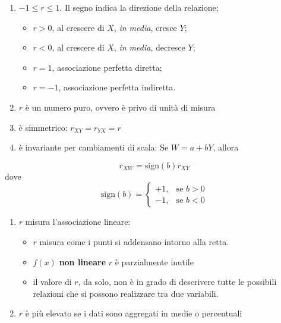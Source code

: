 \documentclass[
  11pt,
]{book}
\providecommand{\tightlist}{%
  \setlength{\itemsep}{0pt}\setlength{\parskip}{0pt}}
\theoremstyle{mytheoremstyle}
\theoremstyle{mydefstyle}
\begin{document}
\begin{info}

\begin{enumerate}
\def\labelenumi{\arabic{enumi}.}
\tightlist
\item
  \(-1 \le r \le 1\). Il segno indica la direzione della relazione;

  \begin{itemize}
  \tightlist
  \item
    \(r>0\), al crescere di \(X\), \emph{in media}, cresce \(Y\);
  \item
    \(r<0\), al crescere di \(X\), \emph{in media}, decresce \(Y\);
  \item
    \(r=1\), associazione perfetta diretta;
  \item
    \(r=-1\), associazione perfetta indiretta.
  \end{itemize}
\item
  \(r\) è un numero puro, ovvero è privo di unità di misura
\item
  è simmetrico: \(r_{XY} = r_{YX} = r\)
\item
  è invariante per cambiamenti di scala:
  Se \(W=a+bY\), allora
\end{enumerate}

\[
r_{XW}=\text{sign}(b) r_{XY}
\]
dove
\[
\text{sign}(b)=\begin{cases}+1, &\text{se $b>0$}\\
             -1, &\text{se $b<0$}
\end{cases}
\]

\begin{enumerate}
\def\labelenumi{\arabic{enumi}.}
\setcounter{enumi}{4}
\tightlist
\item
  \(r\) misura l'associazione lineare:

  \begin{itemize}
  \tightlist
  \item
    \(r\) misura come i punti si addensano intorno alla retta.
  \item
    \(f(x)\) \textbf{non lineare} \(r\) è parzialmente inutile
  \item
    il valore di \(r\), da solo, non è in grado di descrivere tutte le possibili relazioni
    che si possono realizzare tra due variabili.
  \end{itemize}
\item
  \(r\) è più elevato se i dati sono aggregati in medie o percentuali
\end{enumerate}

\end{info}
\end{document}
